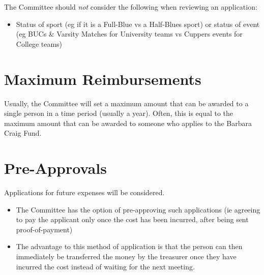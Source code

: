 The Committee should \textit{not} consider the following when reviewing an application:
\begin{itemize}
	\item Status of sport (eg if it is a Full-Blue vs a Half-Blues sport) or status of event (eg BUCs \& Varsity Matches for University teams vs Cuppers events for College teams)
\end{itemize}

\section{Maximum Reimbursements}
Usually, the Committee will set a maximum amount that can be awarded to a single person in a time period (usually a year). Often, this is equal to the maximum amount that can be awarded to someone who applies to the Barbara Craig Fund.

\section{Pre-Approvals}
Applications for future expenses will be considered.
\begin{itemize}
	\item The Committee has the option of pre-approving such applications (ie agreeing to pay the applicant only once the cost has been incurred, after being sent proof-of-payment)
	\item The advantage to this method of application is that the person can then immediately be transferred the money by the treasurer once they have incurred the cost instead of waiting for the next meeting.
\end{itemize}


